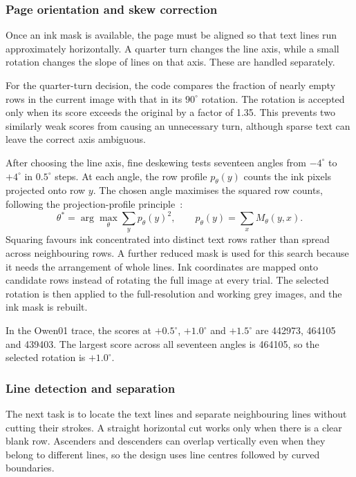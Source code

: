 \subsubsection{Page orientation and skew correction}
Once an ink mask is available, the page must be aligned so that text lines run approximately horizontally. A quarter turn changes the line axis, while a small rotation changes the slope of lines on that axis. These are handled separately.

For the quarter-turn decision, the code compares the fraction of nearly empty rows in the current image with that in its $90^\circ$ rotation. The rotation is accepted only when its score exceeds the original by a factor of 1.35. This prevents two similarly weak scores from causing an unnecessary turn, although sparse text can leave the correct axis ambiguous.

After choosing the line axis, fine deskewing tests seventeen angles from $-4^\circ$ to $+4^\circ$ in $0.5^\circ$ steps. At each angle, the row profile $p_\theta(y)$ counts the ink pixels projected onto row $y$. The chosen angle maximises the squared row counts, following the projection-profile principle~\cite{postl1986}:
\begin{equation}
\theta^*=\arg\max_\theta\sum_y p_\theta(y)^2,\qquad
p_\theta(y)=\sum_x M_\theta(y,x).
\label{eq:des-skew}
\end{equation}
Squaring favours ink concentrated into distinct text rows rather than spread across neighbouring rows. A further reduced mask is used for this search because it needs the arrangement of whole lines. Ink coordinates are mapped onto candidate rows instead of rotating the full image at every trial. The selected rotation is then applied to the full-resolution and working grey images, and the ink mask is rebuilt.

In the Owen01 trace, the scores at $+0.5^\circ$, $+1.0^\circ$ and $+1.5^\circ$ are 442973, 464105 and 439403. The largest score across all seventeen angles is 464105, so the selected rotation is $+1.0^\circ$.

\subsubsection{Line detection and separation}
The next task is to locate the text lines and separate neighbouring lines without cutting their strokes. A straight horizontal cut works only when there is a clear blank row. Ascenders and descenders can overlap vertically even when they belong to different lines, so the design uses line centres followed by curved boundaries.

